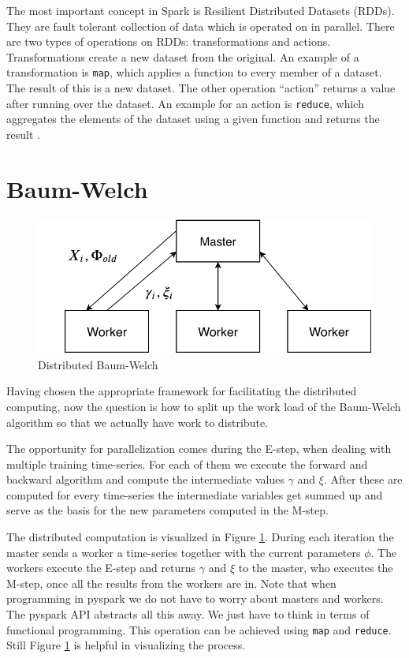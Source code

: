 The most important concept in Spark is Resilient Distributed Datasets (RDDs). They are fault tolerant collection of data which is operated on in parallel. There are two types of operations on RDDs: transformations and actions. Transformations create a new dataset from the original. An example of a transformation is \texttt{map}, which applies a function to every member of a dataset. The result of this is a new dataset. The other operation ``action'' returns a value after running over the dataset. An example for an action is \texttt{reduce}, which aggregates the elements of the dataset using a given  function and returns the result \parencite{rddguide}.

\section{Baum-Welch}
\label{section:distributed-hmm}

\begin{figure}
  \centering
  \includegraphics{figures/distributed.pdf}
  \caption{Distributed Baum-Welch}
  \label{fig:distributed}
\end{figure}

Having chosen the appropriate framework for facilitating the distributed computing, now the question is how to split up the work load of the Baum-Welch algorithm so that we actually have work to distribute. 

The opportunity for parallelization comes during the E-step, when dealing with multiple training time-series. For each of them we execute the forward and backward algorithm and compute the intermediate values $\gamma$ and $\xi$. After these are computed for every time-series the intermediate variables get summed up and serve as the basis for the new parameters computed in the M-step.

The distributed computation is visualized in Figure \ref{fig:distributed}. During each iteration the master sends a worker a time-series together with the current parameters $\phi$. The workers execute the E-step and returns $\gamma$ and $\xi$ to the master, who executes the M-step, once all the results from the workers are in. Note that when programming in pyspark we do not have to worry about masters and workers. The pyspark API abstracts all this away. We just have to think in terms of functional programming. This operation can be achieved using \texttt{map} and \texttt{reduce}. Still Figure \ref{fig:distributed} is helpful in visualizing the process. 

